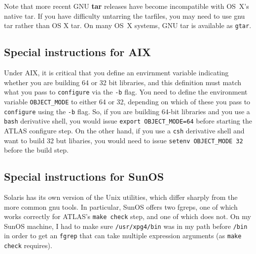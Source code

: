 \documentclass[11pt]{article}
\begin{document}

Note that more recent GNU {\bf tar} releases have become incompatible with 
OS~X's native tar.  If you have difficulty untarring the tarfiles, you
may need to use gnu tar rather than OS X tar.  On many OS~X systems,
GNU tar is available as {\tt gtar}.

\subsection{Special instructions for AIX}
Under AIX, it is critical that you define an envirnment variable
indicating whether you are building 64 or 32 bit libraries, and
this definition must match what you pass to {\tt configure} via the
{\tt -b} flag.  You need to define the environment variable
{\tt OBJECT\_MODE} to either 64 or 32, depending on which of
these you pass to {\tt configure} using the {\tt -b} flag.  So, if you
are building 64-bit libraries and you use a {\tt bash} derivative
shell, you would issue {\tt export OBJECT\_MODE=64} before starting
the ATLAS configure step.  On the other hand, if you use a {\tt csh}
derivative shell and want to build 32 but libaries, you would need
to issue {\tt setenv OBJECT\_MODE 32} before the build step.

\subsection{Special instructions for SunOS}
Solaris has its own version of the Unix utilities, which differ sharply
from the more common gnu tools.  In particular, SunOS offers two fgreps,
one of which works correctly for ATLAS's {\tt make check} step, and
one of which does not.  On my SunOS machine, I had to make sure
{\tt /usr/xpg4/bin} was in my path before {\tt /bin} in order
to get an {\tt fgrep} that can take multiple expression arguments
(as {\tt make check} requires).
\end{document}
